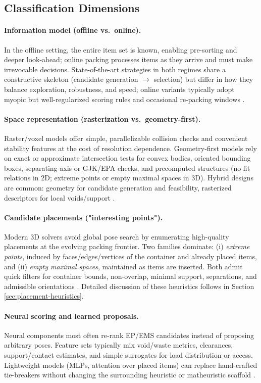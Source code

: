 \subsection{Classification Dimensions}

\paragraph{Information model (offline vs.\ online).}
In the offline setting, the entire item set is known, enabling pre-sorting and deeper look-ahead; online packing processes items as they arrive and must make irrevocable decisions. State-of-the-art strategies in both regimes share a constructive skeleton (candidate generation $\to$ selection) but differ in how they balance exploration, robustness, and speed; online variants typically adopt myopic but well-regularized scoring rules and occasional re-packing windows \cite{ARCO22}.

\paragraph{Space representation (rasterization vs.\ geometry-first).}
Raster/voxel models offer simple, parallelizable collision checks and convenient stability features at the cost of resolution dependence. Geometry-first models rely on exact or approximate intersection tests for convex bodies, oriented bounding boxes, separating-axis or GJK/EPA checks, and precomputed structures (no-fit relations in 2D; extreme points or empty maximal spaces in 3D). Hybrid designs are common: geometry for candidate generation and feasibility, rasterized descriptors for local voids/support \cite{ARCO22}.

\paragraph{Candidate placements ("interesting points").}
Modern 3D solvers avoid global pose search by enumerating high-quality placements at the evolving packing frontier. Two families dominate: (i) \textit{extreme points}, induced by faces/edges/vertices of the container and already placed items, and (ii) \textit{empty maximal spaces}, maintained as items are inserted. Both admit quick filters for container bounds, non-overlap, minimal support, separations, and admissible orientations \cite{ARCO22}. Detailed discussion of these heuristics follows in Section \ref{sec:placement-heuristics}.

\paragraph{Neural scoring and learned proposals.}
Neural components most often re-rank EP/EMS candidates instead of proposing arbitrary poses. Feature sets typically mix void/waste metrics, clearances, support/contact estimates, and simple surrogates for load distribution or access. Lightweight models (MLPs, attention over placed items) can replace hand-crafted tie-breakers without changing the surrounding heuristic or matheuristic scaffold \cite{ARCO22}.

